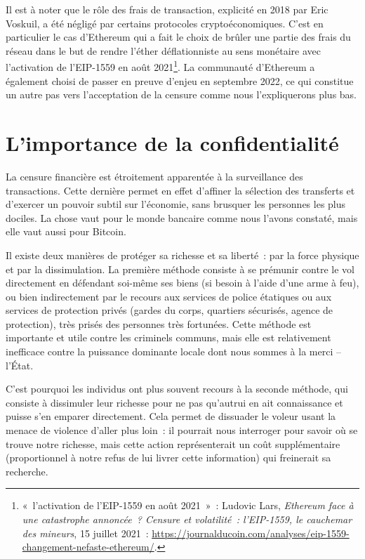 Il est à noter que le rôle des frais de transaction, explicité en 2018 par Eric Voskuil, a été négligé par certains protocoles cryptoéconomiques. C'est en particulier le cas d'Ethereum qui a fait le choix de brûler une partie des frais du réseau dans le but de rendre l'éther déflationniste au sens monétaire avec l'activation de l'EIP-1559 en août 2021\footnote{«~l'activation de l'EIP-1559 en août 2021~»~: Ludovic Lars, \emph{Ethereum face à une catastrophe annoncée~? Censure et volatilité~: l'EIP-1559, le cauchemar des mineurs}, 15 juillet 2021~: \url{https://journalducoin.com/analyses/eip-1559-changement-nefaste-ethereum/}.}. La communauté d'Ethereum a également choisi de passer en preuve d'enjeu en septembre 2022, ce qui constitue un autre pas vers l'acceptation de la censure comme nous l'expliquerons plus bas.

\vspace{-1em}
\section*{L'importance de la confidentialité}

La censure financière est étroitement apparentée à la surveillance des transactions. Cette dernière permet en effet d'affiner la sélection des transferts et d'exercer un pouvoir subtil sur l'économie, sans brusquer les personnes les plus dociles. La chose vaut pour le monde bancaire comme nous l'avons constaté, mais elle vaut aussi pour Bitcoin.


Il existe deux manières de protéger sa richesse et sa liberté~: par la force physique et par la dissimulation. La première méthode consiste à se prémunir contre le vol directement en défendant soi-même ses biens (si besoin à l'aide d'une arme à feu), ou bien indirectement par le recours aux services de police étatiques ou aux services de protection privés (gardes du corps, quartiers sécurisés, agence de protection), très prisés des personnes très fortunées. Cette méthode est importante et utile contre les criminels communs, mais elle est relativement inefficace contre la puissance dominante locale dont nous sommes à la merci -- l'État.

C'est pourquoi les individus ont plus souvent recours à la seconde méthode, qui consiste à dissimuler leur richesse pour ne pas qu'autrui en ait connaissance et puisse s'en emparer directement. Cela permet de dissuader le voleur usant la menace de violence d'aller plus loin~: il pourrait nous interroger pour savoir où se trouve notre richesse, mais cette action représenterait un coût supplémentaire (proportionnel à notre refus de lui livrer cette information) qui freinerait sa recherche.

